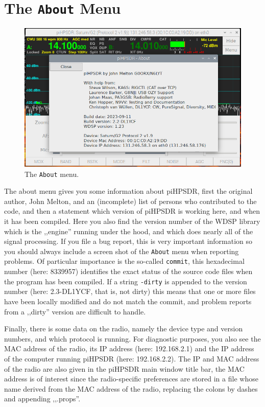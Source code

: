 \documentclass[12pt]{book}
\def\rett#1{\texttt{\color{red}#1}}
\def\bltt#1{\texttt{\color{blue}#1}}
\begin{document}
\clearpage
\section{The \texttt{About} Menu}

\begin{figure}[ht]
\center
\includegraphics[width=12cm]{AboutMenu.png}
\caption{The \bltt{About} menu.}
\end{figure}

The about menu gives you some information about piHPSDR, first the original author,
John Melton,
and an (incomplete) list
of persons who contributed to the code, and then a statement which version of piHPSDR
is working here, and when it has been compiled. Here you also find the version number of the WDSP
 library which is the ,,engine''
running under the hood, and which does nearly all of the signal processing. If you file a bug report,
this is very important information so you should always include a screen shot of the \bltt{About}
menu when reporting problems. Of particular importance is the so-called \rett{commit},
this hexadecimal number (here: 8339957) identifies the exact status of the source code files
when the program has been compiled. If a string \texttt{-dirty} is appended to the version number
(here: 2.3-DL1YCF, that is, not dirty) this means that one or more files have been locally  modified
and do not match the commit, and problem reports from a ,,dirty'' version are difficult to handle.

Finally, there is
some data on the radio, namely the device type and version numbers, and which protocol is running.
For diagnostic purposes, you also see the MAC address of the radio, its IP address (here: 192.168.2.1)
and the
IP address of the computer running piHPSDR (here: 192.168.2.2). The IP and MAC address of
the radio are also given in the piHPSDR main window title bar, the MAC address is of interest since the radio-specific
preferences are stored in a file whose name derived from the MAC address of the radio, replacing
the colons by dashes and appending ,,.props''.
\end{document}
